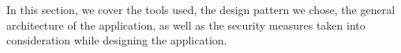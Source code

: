 
In this section, we cover the tools used, the design pattern we chose,  the general architecture of the application, as well as the security measures taken into consideration while designing the application.

